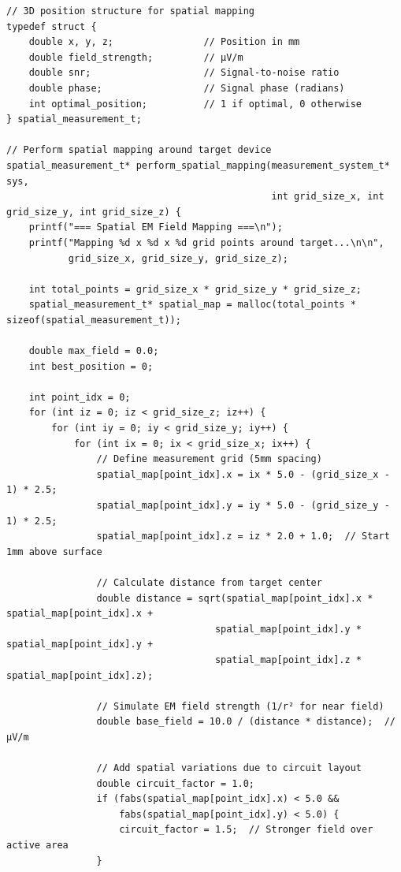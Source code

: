 \documentclass[11pt,a4paper]{article}
\theoremstyle{definition}
\begin{document}
\begin{lstlisting}[caption={Spatial EM Field Mapping}]
// 3D position structure for spatial mapping
typedef struct {
    double x, y, z;                // Position in mm
    double field_strength;         // μV/m
    double snr;                    // Signal-to-noise ratio
    double phase;                  // Signal phase (radians)
    int optimal_position;          // 1 if optimal, 0 otherwise
} spatial_measurement_t;

// Perform spatial mapping around target device
spatial_measurement_t* perform_spatial_mapping(measurement_system_t* sys, 
                                               int grid_size_x, int grid_size_y, int grid_size_z) {
    printf("=== Spatial EM Field Mapping ===\n");
    printf("Mapping %d x %d x %d grid points around target...\n\n", 
           grid_size_x, grid_size_y, grid_size_z);
    
    int total_points = grid_size_x * grid_size_y * grid_size_z;
    spatial_measurement_t* spatial_map = malloc(total_points * sizeof(spatial_measurement_t));
    
    double max_field = 0.0;
    int best_position = 0;
    
    int point_idx = 0;
    for (int iz = 0; iz < grid_size_z; iz++) {
        for (int iy = 0; iy < grid_size_y; iy++) {
            for (int ix = 0; ix < grid_size_x; ix++) {
                // Define measurement grid (5mm spacing)
                spatial_map[point_idx].x = ix * 5.0 - (grid_size_x - 1) * 2.5;
                spatial_map[point_idx].y = iy * 5.0 - (grid_size_y - 1) * 2.5;  
                spatial_map[point_idx].z = iz * 2.0 + 1.0;  // Start 1mm above surface
                
                // Calculate distance from target center
                double distance = sqrt(spatial_map[point_idx].x * spatial_map[point_idx].x + 
                                     spatial_map[point_idx].y * spatial_map[point_idx].y + 
                                     spatial_map[point_idx].z * spatial_map[point_idx].z);
                
                // Simulate EM field strength (1/r² for near field)
                double base_field = 10.0 / (distance * distance);  // μV/m
                
                // Add spatial variations due to circuit layout
                double circuit_factor = 1.0;
                if (fabs(spatial_map[point_idx].x) < 5.0 && 
                    fabs(spatial_map[point_idx].y) < 5.0) {
                    circuit_factor = 1.5;  // Stronger field over active area
                }
                

\end{lstlisting}
\end{document}
